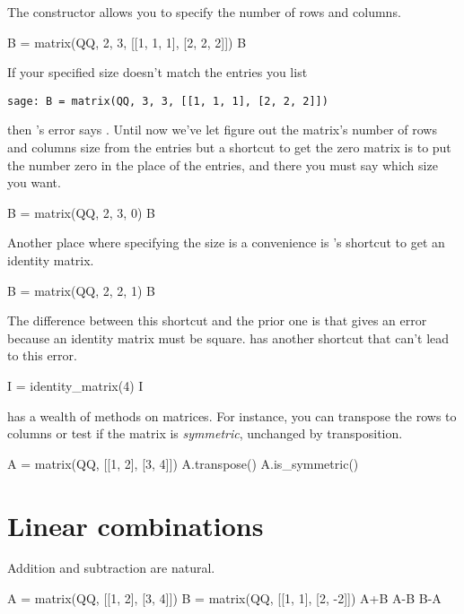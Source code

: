The  constructor allows you to specify the number of
rows and columns.
\begin{sageoutput}
B = matrix(QQ, 2, 3, [[1, 1, 1], [2, 2, 2]])  
B
\end{sageoutput}
\noindent
If your specified size doesn't match the entries you list 
\begin{lstlisting}[style=python]
sage: B = matrix(QQ, 3, 3, [[1, 1, 1], [2, 2, 2]])  
\end{lstlisting}
\noindent
then \Sage's error says
.
Until now we've let \Sage{} figure out the matrix's 
number of rows and columns size from the entries but
a shortcut to get the zero matrix 
is to put the number zero in the place of the entries, and there you
must say which size you want.
\begin{sageoutput}
B = matrix(QQ, 2, 3, 0)                     
B
\end{sageoutput}
\noindent
Another place where specifying the size is a convenience is 
\Sage's shortcut to get an identity matrix.
\begin{sageoutput}
B = matrix(QQ, 2, 2, 1)
B
\end{sageoutput}
\noindent
The difference between this shortcut and the prior one is that 
 gives an error because 
an identity matrix must be square.
\Sage{} has another shortcut that can't lead to this error.
\begin{sageoutput}
I = identity_matrix(4)
I
\end{sageoutput}

\Sage{} has a wealth of methods on matrices.
For instance, you can transpose the rows to columns or test if the 
matrix is \textit{symmetric},
unchanged by transposition.
\begin{sageoutput}
A = matrix(QQ, [[1, 2], [3, 4]])
A.transpose()
A.is_symmetric()
\end{sageoutput}




\section{Linear combinations}
Addition and subtraction are natural.
\begin{sageoutput}
A = matrix(QQ, [[1, 2], [3, 4]])
B = matrix(QQ, [[1, 1], [2, -2]])
A+B
A-B
B-A
\end{sageoutput}

